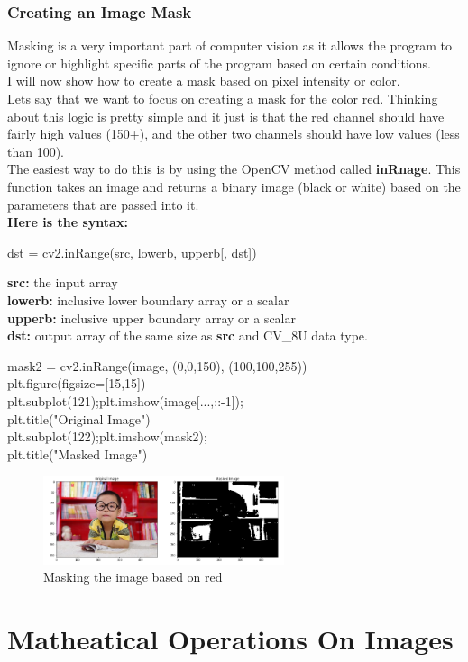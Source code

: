 \documentclass[fleqn]{article}
\begin{document}
    \subsubsection{Creating an Image Mask}
    Masking is a very important part of computer vision as it allows the program to ignore or highlight specific parts of the program based on certain conditions. \\
    I will now show how to create a mask based on pixel intensity or color.\\
    Lets say that we want to focus on creating a mask for the color red. Thinking about this logic is pretty simple and it just is that the red channel should have fairly high values (150+), and the other two channels should have low values (less than 100).\\
    The easiest way to do this is by using the OpenCV method called \textbf{inRnage}. This function takes an image and returns a binary image (black or white) based on the parameters that are passed into it.\\
    \textbf{Here is the syntax: }

    \begin{center}
      dst = cv2.inRange(src, lowerb, upperb[, dst])
    \end{center}

    \textbf{src: }the input array\\
    \indent\textbf{lowerb: }inclusive lower boundary array or a scalar\\
    \indent\textbf{upperb: }inclusive upper boundary array or a scalar\\
    \indent\textbf{dst: }output array of the same size as \textbf{src} and CV\_8U data type.

    \begin{center}
      mask2 = cv2.inRange(image, (0,0,150), (100,100,255))\\
      plt.figure(figsize=[15,15])\\
      plt.subplot(121);plt.imshow(image[...,::-1]);\\
      plt.title("Original Image")\\
      plt.subplot(122);plt.imshow(mask2);\\
      plt.title("Masked Image")\\
    \end{center}

    \begin{figure}[h]
      \centering
      \includegraphics[width=200pt]{maskedimage.png}
      \caption{Masking the image based on red}
      \label{masking}
    \end{figure}


    \newpage

    \section{Matheatical Operations On Images}
\end{document}
